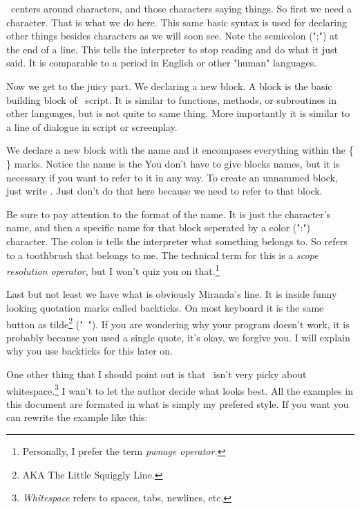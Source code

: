 \documentclass{book}
\begin{document}
 \SSquared\ centers around characters, and those characters saying things.  So first we need a character.  That is what we do here.  This same basic syntax is used for declaring other things besides characters as we will soon see.  Note the semicolon (";") at the end of a line.  This tells the interpreter to stop reading and do what it just said.  It is comparable to a period in English or other "human" languages.

 Now we get to the juicy part.  We declaring a new block.  A block is the basic building block of \SSquared\ script.  It is similar to functions, methods, or subroutines in other languages, but is not quite to same thing.  More importantly it is similar to a line of dialogue in script or screenplay. 

We declare a new block with the name and it encompases everything within the \{ \} marks.  Notice the name is the You don't have to give blocks names, but it is necessary if you want to refer to it in any way.  To create an unnammed block, just write .  Just don't do that here because we need to refer to that block.

Be sure to pay attention to the format of the name.  It is just the character's name, and then a specific name for that block seperated by a color (":") character.  The colon is tells the interpreter what something belongs to.  So  refers to a toothbrush that belongs to me.  The technical term for this is a \emph{scope resolution operator}, but I won't quiz you on that.\footnote{Personally, I prefer the term \emph{pwnage operator.}}

 Last but not least we have what is obviously Miranda's line.  It is inside funny looking quotation marks called backticks. On most keyboard it is the same button as tilde\footnote{AKA The Little Squiggly Line.} ("~"). If you are wondering why your program doesn't work, it is probably because you used a single quote, it's okay, we forgive you.  I will explain why you use backticks for this later on.

One other thing that I should point out is that \SSquared\ isn't very picky about whitespace.\footnote{\emph{Whitespace} refers to spaces, tabs, newlines, etc.}  I wan't to let the author decide what looks best.  All the examples in this document are formated in what is simply my prefered style.  If you want you can rewrite the example like this:
\end{document}
